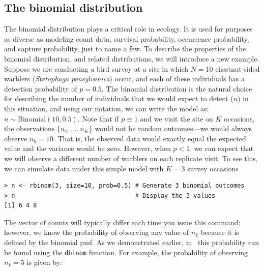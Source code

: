 \subsection{The binomial distribution}

The binomial distribution plays a critical role in ecology. It is
used for purposes as diverse as modeling count data, survival
probability, occurrence probability, and capture probability, just to
name a few.
To describe the properties of the binomial distribution, and related
distributions, we will introduce a new example.
Suppose we are conducting a bird survey at a site in which $N=10$
chestnut-sided warblers (\textit{Stetophaga pensylvanica}) occur, and
each of these individuals has a detection probability of $p=0.5$. The
binomial distribution is the natural choice for describing the number
of individuals that we would expect to detect ($n$) in this
situation, and using our notation, we can write the model as: $n \sim
\text{Binomial}(10, 0.5)$. Note that if $p \equiv 1$ and we visit the
site on $K$ occasions, the observations $\{n_1, \ldots, n_K\}$
would not be random outcomes---we would always observe
$n_k=10$. That is, the observed data would exactly equal the expected
value and the variance would be zero.
However, when $p<1$, we can expect that we will observe
a different number of warblers on each replicate visit. To see this,
we can simulate data under this simple model with $K=3$ survey occasions
\begin{verbatim}
> n <- rbinom(3, size=10, prob=0.5) # Generate 3 binomial outcomes
> n                                 # Display the 3 values
[1] 6 4 8
\end{verbatim}
The vector of counts will typically differ each time you issue this
command; however, we know the probability of observing any value of
$n_k$ because it is defined by the binomial pmf. As we demonstrated
earlier, in \R~this probability can be found using the \verb+dbinom+
function. For example, the probability of observing $n_k=5$ is given by:

